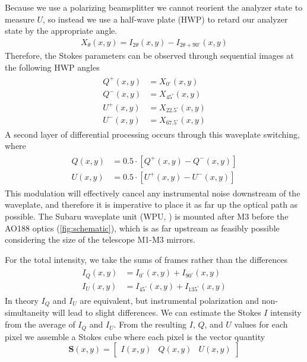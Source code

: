Because we use a polarizing beamsplitter we cannot reorient the analyzer state to measure $U$, so instead we use a half-wave plate (HWP) to retard our analyzer state by the appropriate angle.
\begin{align}
    X_\theta(x, y) = I_{2\theta}(x, y) - I_{2\theta + 90^\circ}(x, y)
\end{align}
Therefore, the Stokes parameters can be observed through sequential images at the following HWP angles
\begin{align}
\begin{split}
    Q^+(x, y) &= X_{0^\circ}(x, y) \\
    Q^-(x, y) &= X_{45^\circ}(x, y) \\
    U^+(x, y) &= X_{22.5^\circ}(x, y) \\
    U^-(x, y) &= X_{67.5^\circ}(x, y)
\end{split}
\end{align}
A second layer of differential processing occurs through this waveplate switching, where
\begin{align}
\begin{split}
    \label{eqn:doublediff}
    Q(x, y) &= 0.5\cdot\left[Q^+(x, y) - Q^-(x, y)\right] \\
    U(x, y) &= 0.5\cdot\left[U^+(x, y) - U^-(x, y)\right]
\end{split}
\end{align}
This modulation will effectively cancel any instrumental noise downstream of the waveplate, and therefore it is imperative to place it as far up the optical path as possible. The Subaru waveplate unit (WPU, \citealt{watanabe_near-infrared_2018}) is mounted after M3 before the AO188 optics (\autoref{fig:schematic}), which is as far upstream as feasibly possible considering the size of the telescope M1-M3 mirrors.

For the total intensity, we take the sums of frames rather than the differences
\begin{align}
\begin{split}
    I_Q(x, y) &= I_{0^\circ}(x, y) + I_{90^\circ}(x,y) \\
    I_U(x, y) &= I_{45^\circ}(x, y) + I_{135^\circ}(x,y)
\end{split}
\end{align}
In theory $I_Q$ and $I_U$ are equivalent, but instrumental polarization and non-simultaneity will lead to slight differences. We can estimate the Stokes $I$ intensity from the average of $I_Q$ and $I_U$. From the resulting $I$, $Q$, and $U$ values for each pixel we assemble a Stokes cube where each pixel is the vector quantity
\begin{equation}
    \mathbf{S}(x, y)= \left[\begin{matrix}
        I(x, y) & Q(x, y) & U(x, y)
    \end{matrix}\right]
\end{equation}

